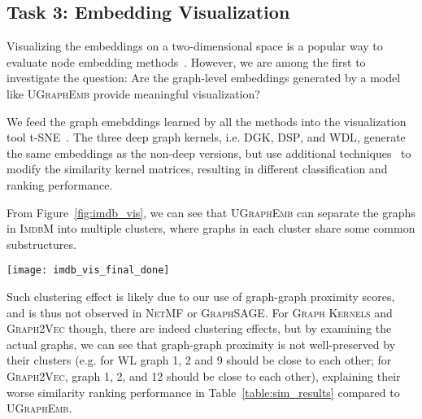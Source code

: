 \documentclass{article}
\newcommand{\model}{\textsc{UGraphEmb}\xspace}
\newcommand{\netmf}{\textsc{NetMF}\xspace}
\newcommand{\graphsage}{\textsc{GraphSAGE}\xspace}
\newcommand{\gk}{\textsc{Graph Kernels}\xspace}
\newcommand{\gv}{\textsc{Graph2Vec}\xspace}
\newcommand{\imdb}{\textsc{ImdbM}\xspace}
\begin{document}
\subsection{Task 3: Embedding Visualization}

Visualizing the embeddings on a two-dimensional space is a popular way to evaluate node embedding methods~\cite{tang2015line}. However, we are among the first to investigate the question: Are the graph-level embeddings generated by a model like \model provide meaningful visualization?

We feed the graph emebddings learned by all the methods into the visualization tool t-SNE~\cite{maaten2008visualizing}. The three deep graph kernels, i.e. \textsc{DGK}, \textsc{DSP}, and \textsc{WDL}, generate the same embeddings as the non-deep versions, but use additional techniques~\cite{yanardag2015deep} to modify the similarity kernel matrices, resulting in different classification and ranking performance.

From Figure~\ref{fig:imdb_vis}, we can see that
\model can separate the graphs in \imdb into multiple clusters, where graphs in each cluster share some common substructures. 




\begin{figure*}[h]
\centering
\texttt{[image: imdb\_vis\_final\_done]}
\caption{Visualization of the \imdb dataset. From (a) to (g), for each method, 12 graphs are plotted. For (h) to (l), we focus on \model: 5 clusters are highlighted in red circles. 12 graphs are sampled from each cluster and plotted to the right.}
\label{fig:imdb_vis}
\vspace*{-3mm}
\end{figure*}



Such clustering effect is likely due to our use of graph-graph proximity scores, and is thus not observed in \netmf or \graphsage. For \gk and \gv though, there are indeed clustering effects, but by examining the actual graphs, we can see that graph-graph proximity is not well-preserved by their clusters (e.g. for \textsc{WL} graph 1, 2 and 9 should be close to each other; for \gv, graph 1, 2, and 12 should be close to each other), explaining their worse similarity ranking performance in Table~\ref{table:sim_results} compared to \model. 
\end{document}
